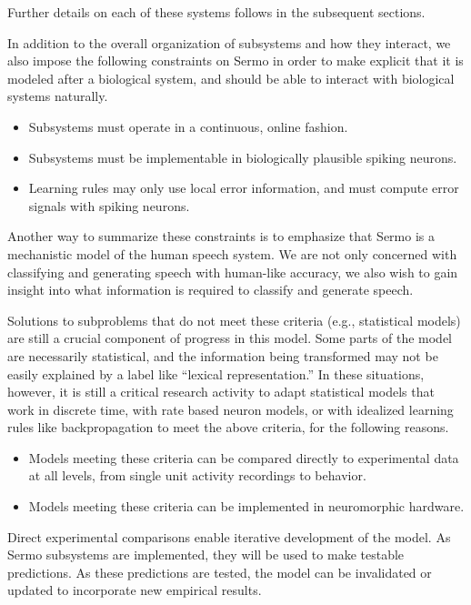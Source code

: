 Further details on each of these
systems follows in the subsequent sections.

In addition to the overall organization
of subsystems and how they interact,
we also impose the following constraints
on Sermo in order to make explicit
that it is modeled after a biological system,
and should be able to interact
with biological systems naturally.

\begin{itemize}
  \item Subsystems must operate in a continuous, online fashion.
  \item Subsystems must be implementable in biologically plausible
    spiking neurons.
  \item Learning rules may only use local error information,
    and must compute error signals with spiking neurons.
\end{itemize}

Another way to summarize these constraints
is to emphasize that Sermo
is a mechanistic model
of the human speech system.
We are not only concerned with
classifying and generating speech
with human-like accuracy,
we also wish to gain insight
into what information is required
to classify and generate speech.

Solutions to subproblems that do not
meet these criteria
(e.g., statistical models)
are still a crucial component
of progress in this model.
Some parts of the model are
necessarily statistical,
and the information being transformed
may not be easily explained
by a label like ``lexical representation.''
In these situations,
however, it is still a critical research activity
to adapt statistical models that work in
discrete time, with rate based neuron models,
or with idealized learning rules like backpropagation
to meet the above criteria,
for the following reasons.

\begin{itemize}
  \item Models meeting these criteria can be compared directly
    to experimental data at all levels,
    from single unit activity recordings to behavior.
  \item Models meeting these criteria can be implemented
    in neuromorphic hardware.
\end{itemize}

Direct experimental comparisons enable
iterative development of the model.
As Sermo subsystems are implemented,
they will be used to make testable predictions.
As these predictions are tested,
the model can be invalidated
or updated to incorporate new empirical results.

